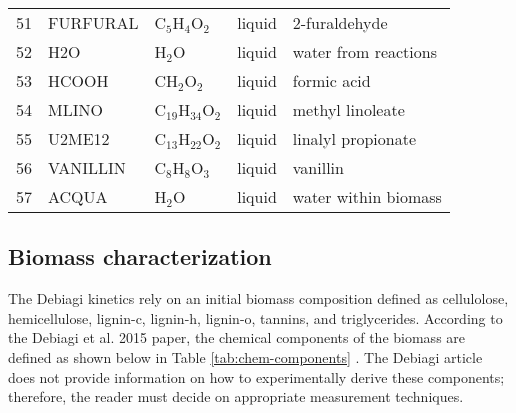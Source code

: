 \begin{center}
\begin{longtable}{cllll}
        51 & FURFURAL       & C$_5$H$_4$O$_2$         & \cellcolor{blue!25}liquid        & 2-furaldehyde \\
        52 & H2O            & H$_2$O                  & \cellcolor{blue!25}liquid        & water from reactions \\
        53 & HCOOH          & CH$_2$O$_2$             & \cellcolor{blue!25}liquid        & formic acid \\
        54 & MLINO          & C$_{19}$H$_{34}$O$_2$   & \cellcolor{blue!25}liquid        & methyl linoleate \\
        55 & U2ME12         & C$_{13}$H$_{22}$O$_2$   & \cellcolor{blue!25}liquid        & linalyl propionate \\
        56 & VANILLIN       & C$_8$H$_8$O$_3$         & \cellcolor{blue!25}liquid        & vanillin \\
        57 & ACQUA          & H$_2$O                  & \cellcolor{blue!25}liquid        & water within biomass \\
        \bottomrule
    \end{longtable}
\end{center}

\subsection{Biomass characterization}

The Debiagi kinetics rely on an initial biomass composition defined as cellulolose, hemicellulose, lignin-c, lignin-h, lignin-o, tannins, and triglycerides. According to the Debiagi et al. 2015 paper, the chemical components of the biomass are defined as shown below in Table \ref{tab:chem-components} \cite{Debiagi-2015}. The Debiagi article does not provide information on how to experimentally derive these components; therefore, the reader must decide on appropriate measurement techniques.

